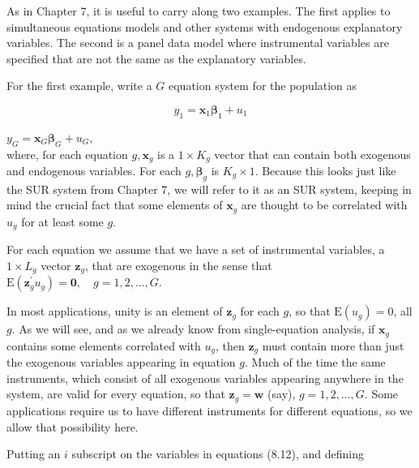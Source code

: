 \documentclass[10pt]{article}
\begin{document}
As in Chapter 7, it is useful to carry along two examples. The first applies to simultaneous equations models and other systems with endogenous explanatory variables. The second is a panel data model where instrumental variables are specified that are not the same as the explanatory variables.

For the first example, write a $G$ equation system for the population as


\begin{equation*}
y_{1}=\mathbf{x}_{1} \boldsymbol{\beta}_{1}+u_{1} \tag{8.12}
\end{equation*}


$y_{G}=\mathbf{x}_{G} \boldsymbol{\beta}_{G}+u_{G}$,\\
where, for each equation $g, \mathbf{x}_{g}$ is a $1 \times K_{g}$ vector that can contain both exogenous and endogenous variables. For each $g, \boldsymbol{\beta}_{g}$ is $K_{g} \times 1$. Because this looks just like the SUR system from Chapter 7, we will refer to it as an SUR system, keeping in mind the crucial fact that some elements of $\mathbf{x}_{g}$ are thought to be correlated with $u_{g}$ for at least some $g$.

For each equation we assume that we have a set of instrumental variables, a $1 \times L_{g}$ vector $\mathbf{z}_{g}$, that are exogenous in the sense that\\
$\mathrm{E}\left(\mathbf{z}_{g}^{\prime} u_{g}\right)=\mathbf{0}, \quad g=1,2, \ldots, G$.

In most applications, unity is an element of $\mathbf{z}_{g}$ for each $g$, so that $\mathrm{E}\left(u_{g}\right)=0$, all $g$. As we will see, and as we already know from single-equation analysis, if $\mathbf{x}_{g}$ contains some elements correlated with $u_{g}$, then $\mathbf{z}_{g}$ must contain more than just the exogenous variables appearing in equation $g$. Much of the time the same instruments, which consist of all exogenous variables appearing anywhere in the system, are valid for every equation, so that $\mathbf{z}_{g}=\mathbf{w}$ (say), $g=1,2, \ldots, G$. Some applications require us to have different instruments for different equations, so we allow that possibility here.

Putting an $i$ subscript on the variables in equations (8.12), and defining
\end{document}

